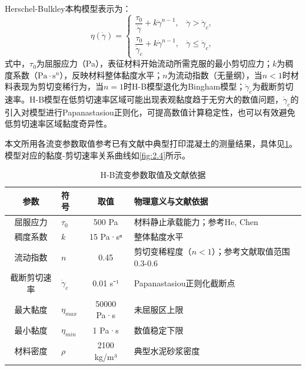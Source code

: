 Herschel-Bulkley本构模型表示为：
\begin{equation}\label{eq:HB}
  \eta(\dot{\gamma}) = \begin{cases}
    \dfrac{\tau_0}{\dot{\gamma}} + k \dot{\gamma}^{n-1}, & \dot{\gamma} > \dot{\gamma}_c, \\[6pt]
    \dfrac{\tau_0}{\dot{\gamma}_c} + k \dot{\gamma}^{n-1}, & \dot{\gamma} \leq \dot{\gamma}_c,
  \end{cases}
\end{equation}
式中，$\tau_0$为屈服应力（Pa），表征材料开始流动所需克服的最小剪切应力；$k$为稠度系数（$\text{Pa} \cdot \text{s}^n$），反映材料整体黏度水平；$n$为流动指数（无量纲），当$n < 1$时材料表现为剪切变稀行为，当$n = 1$时H-B模型退化为Bingham模型；$\dot{\gamma}_c$为截断剪切速率。H-B模型在低剪切速率区域可能出现表观黏度趋于无穷大的数值问题，$\dot{\gamma}_c$的引入对模型进行Papanastasiou正则化，可提高数值计算稳定性，也可以有效避免低剪切速率区域黏度奇异性。

本文所用各流变参数取值参考已有文献中典型打印混凝土的测量结果，具体见\cref{tab:2.2}。模型对应的黏度-剪切速率关系曲线如\cref{fig:2.4}所示。

\begin{table}[!htb]
  \centering
  \caption{H-B流变参数取值及文献依据}\label{tab:2.2}
  \renewcommand{\arraystretch}{1.3}
  \begin{tabular}{clcl}
    \toprule
    \textbf{参数} & \textbf{符号} & \textbf{取值} & \textbf{物理意义与文献依据} \\
    \midrule
    屈服应力      & $\tau_0$         & 500 Pa            & 材料静止承载能力；参考He\cite{he2024}, Chen\cite{chen2020} \\
    稠度系数      & $k$              & 15 Pa·sⁿ          & 整体黏度水平 \\
    流动指数      & $n$              & 0.45              & 剪切变稀程度（$n<1$）；参考文献取值范围0.3-0.6 \\
    截断剪切速率  & $\dot{\gamma}_c$ & 0.01 s⁻¹          & Papanastasiou正则化截断点 \\
    最大黏度      & $\eta_{max}$     & 50000 Pa·s        & 未屈服区上限 \\
    最小黏度      & $\eta_{min}$     & 1 Pa·s            & 数值稳定下限 \\
    材料密度      & $\rho$           & 2100 kg/m³        & 典型水泥砂浆密度 \\
    \bottomrule
  \end{tabular}
\end{table}

